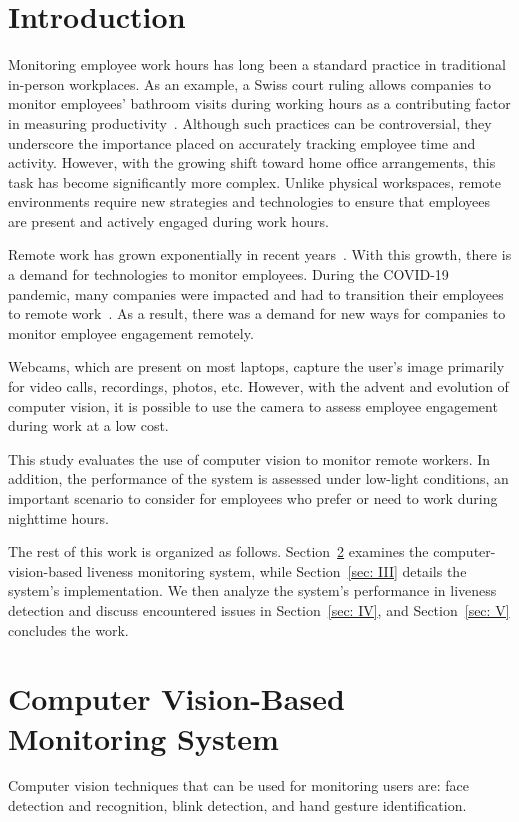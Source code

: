 \documentclass[english,hidelinks]{sbrt}
\begin{document}
\section{Introduction}

Monitoring employee work hours has long been a standard practice in traditional in-person workplaces.
As an example, a Swiss court ruling allows companies to monitor employees' bathroom visits during working hours as a contributing factor in measuring productivity~\cite{Swiss}.
Although such practices can be controversial, they underscore the importance placed on accurately tracking employee time and activity.
However, with the growing shift toward home office arrangements, this task has become significantly more complex.
Unlike physical workspaces, remote environments require new strategies and technologies to ensure that employees are present and actively engaged during work hours.

Remote work has grown exponentially in recent years~\cite{martin2022digitally}.
With this growth, there is a demand for technologies to monitor employees.
During the COVID-19 pandemic, many companies were impacted and had to transition their employees to remote work~\cite{suavescu2022transition}.
As a result, there was a demand for new ways for companies to monitor employee engagement remotely.

Webcams, which are present on most laptops, capture the user’s image primarily for video calls, recordings, photos, etc.
However, with the advent and evolution of computer vision, it is possible to use the camera to assess employee engagement during work at a low cost.

This study evaluates the use of computer vision to monitor remote workers.
In addition, the performance of the system is assessed under low-light conditions, an important scenario to consider for employees who prefer or need to work during nighttime hours.

The rest of this work is organized as follows. Section~\ref{sec: II} examines the computer-vision-based liveness monitoring system, while Section~\ref{sec: III} details the system’s implementation. We then analyze the system’s performance in liveness detection and discuss encountered issues in Section~\ref{sec: IV}, and Section~\ref{sec: V} concludes the work.

\section{Computer Vision-Based Monitoring System}
\label{sec: II}
Computer vision techniques that can be used for monitoring users are: face detection and recognition, blink detection, and hand gesture identification.
\end{document}
